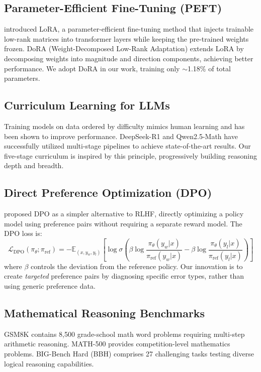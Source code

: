 \documentclass{article}
\begin{document}
\subsection{Parameter-Efficient Fine-Tuning (PEFT)}
\citet{hu2022lora} introduced LoRA, a parameter-efficient fine-tuning method that injects trainable low-rank matrices into transformer layers while keeping the pre-trained weights frozen. DoRA (Weight-Decomposed Low-Rank Adaptation) \citep{liu2024dora} extends LoRA by decomposing weights into magnitude and direction components, achieving better performance. We adopt DoRA in our work, training only $\sim$1.18\% of total parameters.

\subsection{Curriculum Learning for LLMs}
Training models on data ordered by difficulty mimics human learning and has been shown to improve performance. DeepSeek-R1 \citep{deepseekr1} and Qwen2.5-Math \citep{qwen2025qwen25} have successfully utilized multi-stage pipelines to achieve state-of-the-art results. Our five-stage curriculum is inspired by this principle, progressively building reasoning depth and breadth.

\subsection{Direct Preference Optimization (DPO)}
\citet{rafailov2023direct} proposed DPO as a simpler alternative to RLHF, directly optimizing a policy model using preference pairs without requiring a separate reward model. The DPO loss is:
\begin{equation}
\mathcal{L}_{\text{DPO}}(\pi_\theta; \pi_{\text{ref}}) = -\mathbb{E}_{(x, y_w, y_l)} \left[ \log \sigma \left( \beta \log \frac{\pi_\theta(y_w|x)}{\pi_{\text{ref}}(y_w|x)} - \beta \log \frac{\pi_\theta(y_l|x)}{\pi_{\text{ref}}(y_l|x)} \right) \right]
\end{equation}
where $\beta$ controls the deviation from the reference policy. Our innovation is to create \textit{targeted} preference pairs by diagnosing specific error types, rather than using generic preference data.

\subsection{Mathematical Reasoning Benchmarks}
GSM8K \citep{cobbe2021gsm8k} contains 8,500 grade-school math word problems requiring multi-step arithmetic reasoning. MATH-500 provides competition-level mathematics problems. BIG-Bench Hard (BBH) \citep{suzgun2022bbh} comprises 27 challenging tasks testing diverse logical reasoning capabilities.
\end{document}
